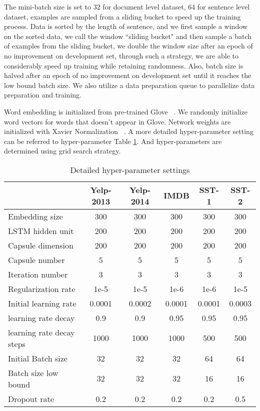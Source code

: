 \documentclass[11pt]{article}
\begin{document}
The mini-batch size is set to 32 for document level dataset, 64 for sentence level dataset, examples are sampled from a sliding bucket to speed up the training process. Data is sorted by the length of sentence, and we first sample a window on the sorted data, we call the window ``sliding bucket" and then sample a batch of examples from the sliding bucket, we double the window size after an epoch of no improvement on development set, through such a strategy, we are able to considerably speed up training while retaining randomness. Also, batch size is halved after an epoch of no improvement on development set until it reaches the low bound batch size. We also utilize a data preparation queue to parallelize data preparation and training.

Word embedding is initialized from pre-trained Glove ~\cite{pennington2014glove}.
We randomly initialize word vectors for words that doesn't appear in Glove. Network weights are initialized with Xavier Normalization ~\cite{glorot2010understanding}. 
A more detailed hyper-parameter setting can be referred to hyper-parameter Table \ref{tab:hypersetting}. And hyper-parameters are determined using grid search strategy.

\begin{table}[t!] \setlength{\tabcolsep}{3pt}
  \centering \begin{tabular}{lccccc}
    \toprule
  &\textbf{Yelp-2013} &\textbf{Yelp-2014} & \textbf{IMDB} &\textbf{SST-1} & \textbf{SST-2}\\
\midrule Embedding size           		&300    	&300       	&300  		&300     &300     \\
LSTM hidden unit         		&200		&200       	&200    	&200     &200     \\
Capsule dimension	        	&200		&200       	&200    	&200     &200     \\
Capsule number	         		&5			&5       	&5    		&5     	 &5     \\
Iteration number	         	&3			&3       	&3    		&3     	 &3     \\
Regularization rate        		&1e-5      	&1e-5
&1e-6   	&1e-6    &1e-5    \\
Initial learning rate         	&0.0001     &0.0002     &0.0001   	&0.0001  &0.0003  \\
learning rate decay        		&0.9      	&0.9      	&0.95   	&0.95    &0.95    \\
learning rate decay steps       &1000      	&1000     	&1000   	&500     &500  \\
Initial Batch size         		&32      	&32     	&32   		&64      &64   \\
Batch size low bound         	&32      	&32     	&32   		&16      &16   \\
Dropout rate         			&0.2      	&0.2      	&0.2   		&0.2     &0.5  \\

    \bottomrule
  \end{tabular}
  \caption{Detailed hyper-parameter settings}
  \label{tab:hypersetting}
\end{table}
\end{document}
